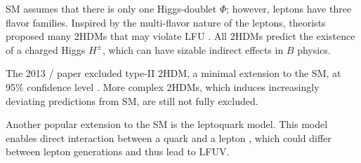 SM assumes that there is only one Higgs-doublet $\Phi$; however, leptons have
three flavor families.
Inspired by the multi-flavor nature of the leptons, theorists proposed many
2HDMs that may violate LFU \cite{Branco:2011iw}.
All 2HDMs predict the existence of a charged Higgs $H^{\pm}$, which can have
sizable indirect effects in $B$ physics.

The 2013 \BaBar/ paper excluded type-II 2HDM, a minimal extension to the SM, at
95\% confidence level \cite{Lees:2013uzd}.
More complex 2HDMs, which induces increasingly deviating predictions from SM,
are still not fully excluded.

Another popular extension to the SM is the leptoquark model.
This model enables direct interaction between a quark and a
lepton \cite{Faber:2018afz}, which could differ between lepton generations and
thus lead to LFUV.
